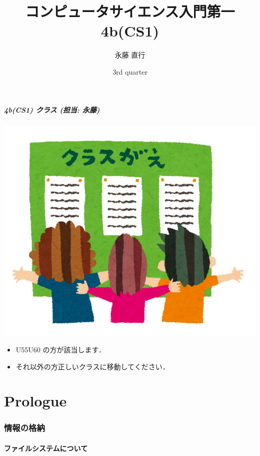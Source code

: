 \documentclass[final,c]{beamer}
\title[elementaryCS-1st]{コンピュータサイエンス入門第一\\ \textemdash 4b(CS1)\textemdash}
\date[3rd quarter]{3rd quarter}
\author[Naoyuki Nagatou]{永藤 直行}
\institute[TITECH]{東京工業大学}
\begin{document}
\begin{frame}[shrink]
\frametitle{4b(CS1) クラス (担当: 永藤)}
  \begin{center}
\includegraphics[scale=.13]{./Figure/classgae.png}
  \end{center}
  \begin{itemize}
\item U55\textendash U60 の方が該当します．
\item それ以外の方正しいクラスに移動してください．
  \end{itemize}
\end{frame}

\frame{\titlepage}
%
%
\part{Prologue}


%
%
%
%
\section{情報の格納}
\subsection{ファイルシステムについて}



%
%
\end{document}
